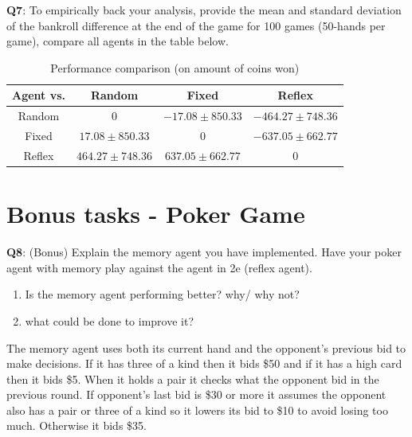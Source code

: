\documentclass{article}
\begin{document}
\begin{tcolorbox}
\textbf{Q7}: To empirically back your analysis, provide the mean and standard deviation of the bankroll difference at the end of the game for 100 games (50-hands per game), compare all agents in the table below.
\end{tcolorbox}

\begin{table}[H]
\vspace{1cm}
\begin{center}
\begin{tabular}{cccc}
\toprule
 Agent vs. & Random & Fixed  & Reflex \\ \midrule
Random & 0 & $-17.08 \pm 850.33$ & $-464.27 \pm 748.36$ \\
Fixed & $17.08 \pm 850.33$ & 0 & $-637.05 \pm 662.77$ \\
Reflex & $464.27 \pm 748.36$ & $637.05 \pm 662.77$ & 0 \\
\bottomrule
\end{tabular}
\end{center}
\caption{Performance comparison (on amount of coins won)}
\label{tab:comparison}
\end{table}


\section*{Bonus tasks - Poker Game}

\begin{tcolorbox}
\textbf{Q8}: (Bonus) Explain the memory agent you have implemented. Have your poker agent with memory play against the agent in 2e (reflex agent).        
        \begin{enumerate}
            \item Is the memory agent performing better? why/ why not?
            \item what could be done to improve it?
        \end{enumerate}
\end{tcolorbox}

The memory agent uses both its current hand and the opponent's previous bid to make decisions. If it has three of a kind then it bids \$50 and if it has a high card then it bids \$5. When it holds a pair it checks what the opponent bid in the previous round. If opponent's last bid is \$30 or more it assumes the opponent also has a pair or three of a kind so it lowers its bid to \$10 to avoid losing too much. Otherwise it bids \$35.
\end{document}
